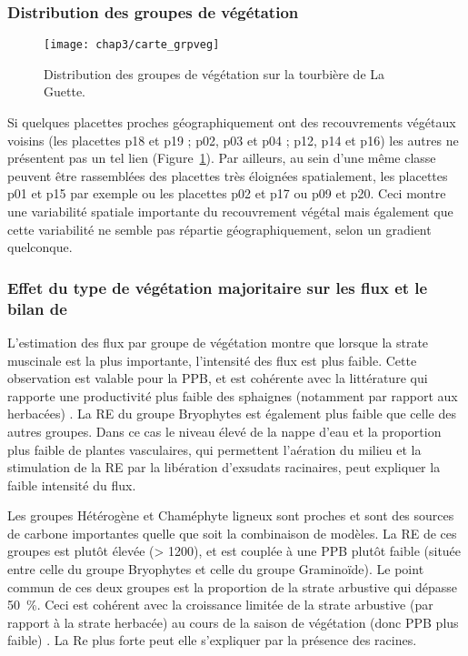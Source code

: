 \subsubsection{Distribution des groupes de végétation}


\begin{figure}
\centering
\texttt{[image: chap3/carte\_grpveg]}
\caption{Distribution des groupes de végétation sur la tourbière de La Guette.}
\label{fig:carte_grpveg}
\end{figure}

Si quelques placettes proches géographiquement ont des recouvrements végétaux voisins (les placettes p18 et p19 ; p02, p03 et p04 ; p12, p14 et p16) les autres ne présentent pas un tel lien (Figure~\ref{fig:carte_grpveg}).
Par ailleurs, au sein d'une même classe peuvent être rassemblées des placettes très éloignées spatialement, les placettes p01 et p15 par exemple ou les placettes p02 et p17 ou p09 et p20.
Ceci montre une variabilité spatiale importante du recouvrement végétal mais également que cette variabilité ne semble pas répartie géographiquement, selon un gradient quelconque.

\subsubsection{Effet du type de végétation majoritaire sur les flux et le bilan de \coo}

L'estimation des flux par groupe de végétation montre que lorsque la strate muscinale est la plus importante, l'intensité des flux est plus faible.
Cette observation est valable pour la PPB, et est cohérente avec la littérature qui rapporte une productivité plus faible des sphaignes (notamment par rapport aux herbacées) \citep{rydin2013b,beyer2015}. 
La RE du groupe Bryophytes est également plus faible que celle des autres groupes.
Dans ce cas le niveau élevé de la nappe d'eau et la proportion plus faible de plantes vasculaires, qui permettent l'aération du milieu et la stimulation de la RE par la libération d'exsudats racinaires, peut expliquer la faible intensité du flux.

Les groupes Hétérogène et Chaméphyte ligneux sont proches et sont des sources de carbone importantes quelle que soit la combinaison de modèles.
La RE de ces groupes est plutôt élevée (> \SI{1200}{\gcma}), et est couplée à une PPB plutôt faible (située entre celle du groupe Bryophytes et celle du groupe Graminoïde).
Le point commun de ces deux groupes est la proportion de la strate arbustive qui dépasse \SI{50}{\percent}.
Ceci est cohérent avec la croissance limitée de la strate arbustive (par rapport à la strate herbacée) au cours de la saison de végétation (donc PPB plus faible) \citep{rydin2013b}.
La Re plus forte peut elle s'expliquer par la présence des racines.

